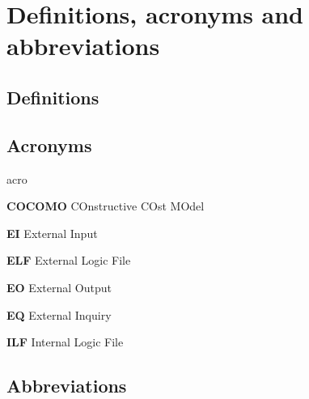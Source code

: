 \section{Definitions, acronyms and abbreviations}

\subsection{Definitions}

\subsection{Acronyms}
	\begin{labeling}{acro}
		\item[\textbf{COCOMO}] COnstructive COst MOdel
		\item[\textbf{EI}] External Input
		\item[\textbf{ELF}] External Logic File
		\item[\textbf{EO}] External Output
		\item[\textbf{EQ}] External Inquiry
		\item[\textbf{ILF}] Internal Logic File
	\end{labeling}

\subsection{Abbreviations}
